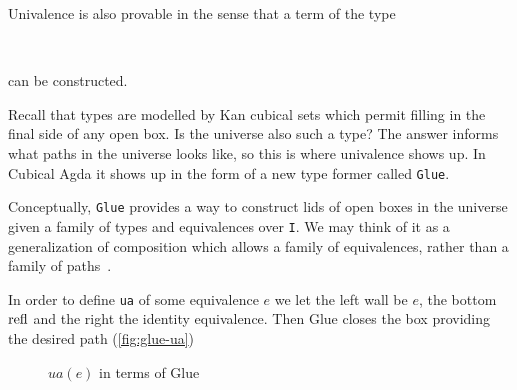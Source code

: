 Univalence is also provable in the sense that a term of the type
\begin{code}[hide]%
\>[0]\<%
\\
\>[0][@{}l@{\AgdaIndent{0}}]%
\>[2]\AgdaSpace{}%
\AgdaSymbol{:}\<%
\end{code}
\begin{code}%
\>[2][@{}l@{\AgdaIndent{1}}]%
\>[4]\AgdaSymbol{\{}\AgdaSpace{}%
\AgdaSpace{}%
\AgdaSymbol{:}\AgdaSpace{}%
\AgdaSymbol{\}}\AgdaSpace{}%
\AgdaSpace{}%
\AgdaSymbol{(}\AgdaSpace{}%
\AgdaSpace{}%
\AgdaSymbol{)}\AgdaSpace{}%
\AgdaSpace{}%
\AgdaSymbol{(}\AgdaSpace{}%
\AgdaSpace{}%
\AgdaSymbol{)}\<%
\end{code}
can be constructed.

Recall that types are modelled by Kan cubical sets which permit filling in
the final side of any open box. Is the universe also such a type? The answer
informs what paths in the universe looks like, so this is where univalence
shows up. In Cubical Agda it shows up in the form of a new type former called
\texttt{Glue}.

Conceptually, \texttt{Glue} provides a way to construct lids
of open boxes in the universe given a family of types and equivalences over \texttt{I}.
We may think of it as a generalization of composition which allows a family of equivalences,
rather than a family of paths~\cite{1labUnivalence}.

In order to define \texttt{ua} of some equivalence $e$ we let the left wall be
$e$, the bottom $\operatorname{refl}$ and the right the identity equivalence.
Then Glue closes the box providing the desired path (\autoref{fig:glue-ua})
\begin{figure}[h]
\centering
{}
\caption{$ua(e)$ in terms of Glue}
\label{fig:glue-ua}
\end{figure}

